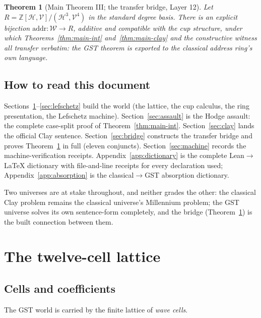 \documentclass[11pt,a4paper]{article}
\theoremstyle{plain}
\newtheorem{theorem}{Theorem}[section]
\theoremstyle{definition}
\newcommand{\Z}{\mathbb{Z}}
\newcommand{\HC}{\mathcal{H}}
\newcommand{\VV}{\mathcal{V}}
\begin{document}
\begin{theorem}[Main Theorem III; the transfer bridge, Layer 12]\label{thm:main-bridge}
Let $R=\Z[\HC,\VV]/(\HC^{3},\VV^{4})$ in the standard degree basis. There is
an explicit bijection $\mathrm{addr}\colon\mathcal{W}\to R$, additive and
compatible with the cup structure, under which Theorems~\ref{thm:main-int}
and~\ref{thm:main-clay} and the constructive witness all transfer verbatim:
the GST theorem is exported to the classical address ring's own language.
\end{theorem}

\subsection{How to read this document}

Sections~\ref{sec:lattice}--\ref{sec:lefschetz} build the world (the lattice,
the cup calculus, the ring presentation, the Lefschetz machine).
Section~\ref{sec:assault} is the Hodge assault: the complete case-split proof
of Theorem~\ref{thm:main-int}. Section~\ref{sec:clay} lands the official Clay
sentence. Section~\ref{sec:bridge} constructs the transfer bridge and proves
Theorem~\ref{thm:main-bridge} in full (eleven conjuncts).
Section~\ref{sec:machine} records the machine-verification receipts.
Appendix~\ref{app:dictionary} is the complete Lean$\to$LaTeX dictionary with
file-and-line receipts for every declaration used; Appendix~\ref{app:absorption}
is the classical$\to$GST absorption dictionary.

Two universes are at stake throughout, and neither grades the other: the
classical Clay problem remains the classical universe's Millennium problem;
the GST universe solves its own sentence-form completely, and the bridge
(Theorem~\ref{thm:main-bridge}) is the built connection between them.

\section{The twelve-cell lattice}\label{sec:lattice}

\subsection{Cells and coefficients}

The GST world is carried by the finite lattice of \emph{wave cells}.
\end{document}
